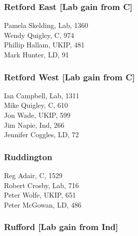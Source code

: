 \documentclass[a4paper,openany,10pt]{book}
\begin{document}
\subsubsection*{Retford East \hspace*{\fill}\nolinebreak[1]%
\enspace\hspace*{\fill}
[Lab gain from C]}



Pamela Skelding, Lab, 1360\\
Wendy Quigley, C, 974\\
Phillip Hallam, UKIP, 481\\
Mark Hunter, LD, 91\\


\subsubsection*{Retford West \hspace*{\fill}\nolinebreak[1]%
\enspace\hspace*{\fill}
[Lab gain from C]}



Ian Campbell, Lab, 1311\\
Mike Quigley, C, 610\\
Jon Wade, UKIP, 599\\
Jim Napie, Ind, 266\\
Jennifer Coggles, LD, 72\\


\subsubsection*{Ruddington}



Reg Adair, C, 1529\\
Robert Crosby, Lab, 716\\
Peter Wolfe, UKIP, 651\\
Peter McGowan, LD, 486\\


\subsubsection*{Rufford \hspace*{\fill}\nolinebreak[1]%
\enspace\hspace*{\fill}
[Lab gain from Ind]}
\end{document}
